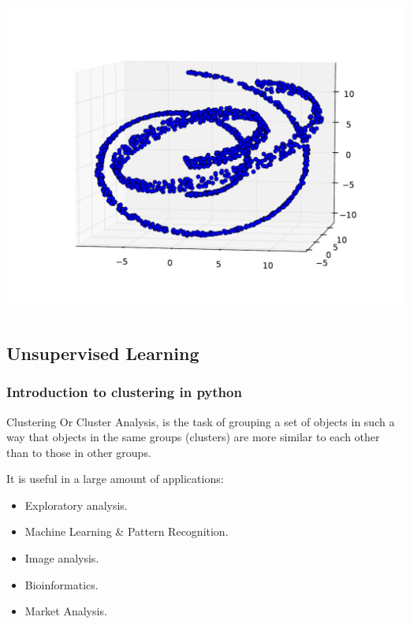 \documentclass[10pt, colorlinks]{beamer}
\begin{document}
\begin{frame}[fragile]\frametitle{}
\begin{columns}[c]
\column{\textwidth}
\includegraphics[width=\textwidth]{plwfigis/CursP_4_figure4}


\end{columns}
\end{frame}

\subsection{Unsupervised Learning} %
\label{sec:Clustering}


\begin{frame}[fragile]\frametitle{Introduction to clustering in python}
\begin{block}{Clustering}
Or Cluster Analysis, is the task of grouping a set of objects in such a way that objects in the same groups (clusters) are more similar to each other than to those in other groups.
\end{block}
It is useful in a large amount of applications:
   \begin{itemize}
       \item Exploratory analysis.
        \item Machine Learning \& Pattern Recognition.
        \item Image analysis.
        \item Bioinformatics.
        \item Market Analysis.
   \end{itemize}
\end{frame}
\end{document}
